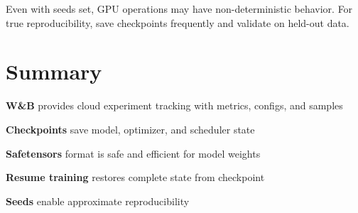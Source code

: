 \begin{keypoint}
Even with seeds set, GPU operations may have non-deterministic behavior. For true reproducibility, save checkpoints frequently and validate on held-out data.
\end{keypoint}

\section{Summary}

\begin{summary}
    \item \textbf{W\&B} provides cloud experiment tracking with metrics, configs, and samples
    \item \textbf{Checkpoints} save model, optimizer, and scheduler state
    \item \textbf{Safetensors} format is safe and efficient for model weights
    \item \textbf{Resume training} restores complete state from checkpoint
    \item \textbf{Seeds} enable approximate reproducibility
\end{summary}

